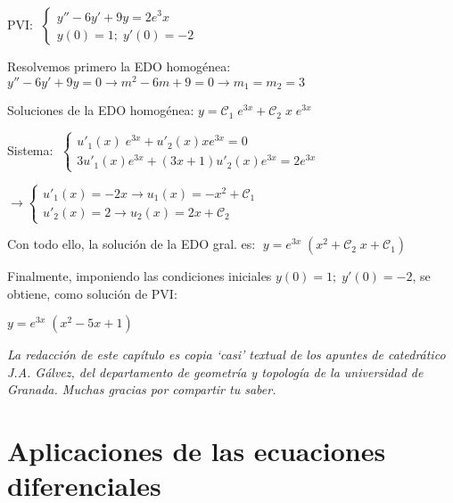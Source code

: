\begin{cuadro-gris}
\begin{ejem}
	PVI: $\; \begin{cases} y''-6y'+9y=2e^3x \\ y(0)=1; \; y'(0)=-2 \end{cases}$

Resolvemos primero la EDO homogénea: $y''-6y'+9y=0 \to m^2-6m+9=0 \to m_1=m_2=3$

Soluciones de la EDO homogénea: $y=\mathcal{C}_1 \; e^{3x} + \mathcal{C}_2\; x \; e^{3x}$

Sistema: $\; \begin{cases}
 u'_1(x)\; e^{3x} + u'_2(x) x e^{3x} =0 \\
 3u'_1(x) e^{3x}+(3x+1) u'_2(x) e^{3x}=2 e^{3x}	
 \end{cases} 	$
 
 $\to \begin{cases}
 u'_1(x)= -2x \to u_1(x)=-x^2 + \mathcal{C}_1 \\
 u'_2(x)=2 \to u_2(x)=2x+\mathcal{C}_2	
 \end{cases}$
 
 Con todo ello, la solución de la EDO gral. es:  $\; y=e^{3x}\; (x^2+\mathcal{C}_2\; x + \mathcal{C}_1)$
 
 Finalmente, imponiendo las condiciones iniciales $y(0)=1; \; y'(0)=-2$, se obtiene, como solución de PVI:
 
 \hspace{30mm} $y=e^{3x}\; (x^2-5x+1)$
 

\end{ejem}
\end{cuadro-gris}


\textit{La redacción de este capítulo es copia `casi' textual de los apuntes de catedrático J.A. Gálvez, del departamento de geometría y topología de la universidad de Granada. Muchas gracias por compartir tu saber.}


\vspace{10mm}

\section{Aplicaciones de las ecuaciones diferenciales}


